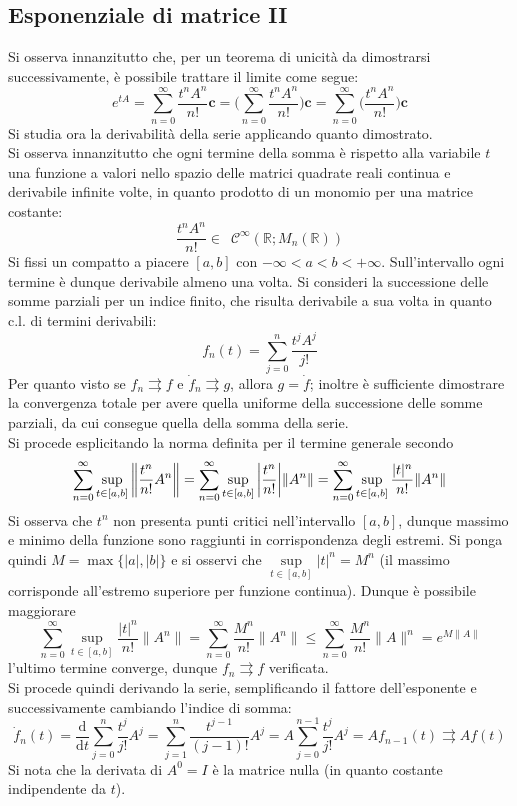 \documentclass[10pt]{article}
\theoremstyle{plain}
\begin{document}
\subsection{Esponenziale di matrice II}
Si osserva innanzitutto che, per un teorema di unicità da dimostrarsi successivamente, è possibile trattare il limite come segue:
\[e^{tA} = \sum\limits_{n=0}^\infty \frac{t^n A^n}{n!} \mathbf{c} = \bigg(\sum\limits_{n=0}^\infty \frac{t^n A^n}{n!}\bigg) \mathbf{c} = \sum\limits_{n=0}^\infty \bigg(\frac{t^n A^n}{n!}\bigg) \mathbf{c}\]
Si studia ora la derivabilità della serie applicando quanto dimostrato.
\\Si osserva innanzitutto che ogni termine della somma è rispetto alla variabile $t$ una funzione a valori nello spazio delle matrici quadrate reali continua e derivabile infinite volte, in quanto prodotto di un monomio per una matrice costante:
\[\frac{t^n A^n}{n!} \in \enspace \mathcal{C}^{\infty}(\mathbb{R} ; M_n(\mathbb{R}))\]
Si fissi un compatto a piacere $[a,b]$ con $- \infty < a < b < + \infty$. Sull'intervallo ogni termine è dunque derivabile almeno una volta. Si consideri la successione delle somme parziali per un indice finito, che risulta derivabile a sua volta in quanto c.l. di termini derivabili:
\[f_n(t) = \sum\limits_{j=0}^n \frac{t^j A^j}{j!}\]
Per quanto visto se $f_n \rightrightarrows f$ e $\dot{f}_n \rightrightarrows g$, allora $g = \dot{f}$; inoltre è sufficiente dimostrare la convergenza totale per avere quella uniforme della successione delle somme parziali, da cui consegue quella della somma della serie. 
\\Si procede esplicitando la norma definita per il termine generale secondo
\[\sum\limits_{n=0}^\infty \sup\limits_{t \in [a,b]}\bigg{\|}\frac{t^n}{n!}A^n\bigg{\|} = \sum\limits_{n=0}^\infty \sup\limits_{t \in [a,b]}\bigg{|}\frac{t^n}{n!}\bigg| \|A^n\| = \sum\limits_{n=0}^\infty \sup\limits_{t \in [a,b]}\frac{|t|^n}{n!}\|A^n\|\]
Si osserva che $t^n$ non presenta punti critici nell'intervallo $[a,b]$, dunque massimo e minimo della funzione sono raggiunti in corrispondenza degli estremi. Si ponga quindi $M = \max\{|a|, |b|\}$ e si osservi che $\displaystyle \sup\limits_{t \in[a,b]}|t|^n = M^n$ (il massimo corrisponde all'estremo superiore per funzione continua). Dunque è possibile maggiorare 
\[\sum\limits_{n=0}^\infty \sup\limits_{t \in [a,b]}\frac{|t|^n}{n!}\|A^n\| = \sum\limits_{n=0}^\infty \frac{M^n}{n!}\|A^n\| \leq \sum\limits_{n=0}^\infty \frac{M^n}{n!}\|A\|^n = e^{\displaystyle M \|A\|}\]
l'ultimo termine converge, dunque $f_n \rightrightarrows f$ verificata.
\\Si procede quindi derivando la serie, semplificando il fattore dell'esponente e successivamente cambiando l'indice di somma:
\[\dot{f}_n(t) = \frac{\textrm{d}}{\textrm{d}t} \sum\limits_{j=0}^n \frac{t^j}{j!}A^j = \sum\limits_{j=1}^n \frac{t^{j-1}}{(j-1)!}A^j = A \sum\limits_{j=0}^{n-1} \frac{t^j}{j!}A^j = A f_{n-1}(t) \rightrightarrows Af(t)\]
Si nota che la derivata di $A^0 = I$ è la matrice nulla (in quanto costante indipendente da $t$).
\end{document}

